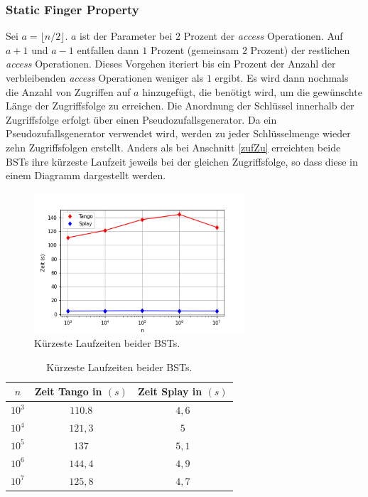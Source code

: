 \documentclass[a4paper,12pt]{article}
\begin{document}
\subsubsection{Static Finger Property}
Sei $a = \lfloor n / 2\rfloor$.  $a$ ist der Parameter bei $2$ Prozent der \textit{access} Operationen. Auf $a+1$ und $a-1$ entfallen dann $1$ Prozent (gemeinsam $2$ Prozent) der restlichen \textit{access} Operationen. Dieses Vorgehen iteriert bis ein Prozent der Anzahl der verbleibenden \textit{access} Operationen weniger als $1$ ergibt. Es wird dann nochmals die Anzahl von Zugriffen auf $a$ hinzugefügt, die benötigt wird, um die gewünschte Länge der Zugriffsfolge zu erreichen. Die Anordnung der Schlüssel innerhalb der Zugriffsfolge erfolgt über einen Pseudozufallsgenerator. Da ein Pseudozufallsgenerator verwendet wird, werden zu jeder Schlüsselmenge wieder zehn Zugriffsfolgen erstellt. Anders als bei Anschnitt \ref{zufZu} erreichten beide BSTs ihre kürzeste Laufzeit jeweils bei der gleichen Zugriffsfolge, so dass diese in einem Diagramm dargestellt werden.\\ 
\begin{figure}[H]
	\centering
	\includegraphics[width=0.7\textwidth]{Medien/laufzeittest/diagramm/staticfinger1}
	\caption{Kürzeste Laufzeiten beider BSTs.}
\end{figure}
\begin{table}[H]
	\begin{center}
		\begin{tabular}[c]{|c|c|c|}
			\hline
			$n$ & Zeit Tango in $\left(s\right)$ &Zeit Splay in $\left(s\right)$ \\
			\hline
			$10^3$ & $110.8$ &$4,6$ \\
			\hline
			$10^4$  & $121,3$ &$5$  \\
			\hline
			$10^5$  & $137$ &  $5,1$  \\
			\hline
			$10^6$  & $144,4$ &$4,9$  \\
			\hline
			$10^7$  & $125,8$ &$4,7$  \\
			\hline
		\end{tabular}
		\caption{Kürzeste Laufzeiten beider BSTs.} 
	\end{center}
\end{table}
\end{document}
